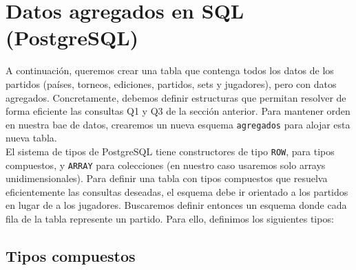 \section{Datos agregados en SQL (PostgreSQL)}

A continuación, queremos crear una tabla que contenga todos los datos de los partidos (países, torneos, ediciones, partidos, sets y jugadores), pero con datos agregados. Concretamente, debemos definir estructuras que permitan resolver de forma eficiente las consultas Q1 y Q3 de la sección anterior. Para mantener orden en nuestra bae de datos, crearemos un nueva esquema \texttt{agregados} para alojar esta nueva tabla. \\

El sistema de tipos de PostgreSQL tiene constructores de tipo \texttt{ROW}, para tipos compuestos, y \texttt{ARRAY} para colecciones (en nuestro caso usaremos solo arrays unidimensionales). Para definir una tabla con tipos compuestos que resuelva eficientemente las consultas deseadas, el esquema debe ir orientado a los partidos en lugar de a los jugadores. Buscaremos definir entonces un esquema donde cada fila de la tabla represente un partido. Para ello, definimos los siguientes tipos:

\subsection{Tipos compuestos}

